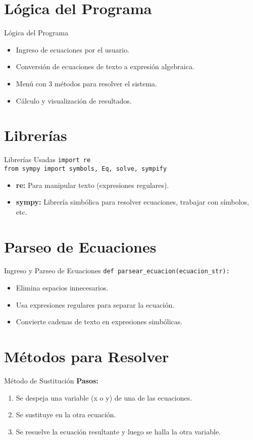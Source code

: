 \documentclass{beamer}
\begin{document}
\section{Lógica del Programa}
\begin{frame}{Lógica del Programa}
  \begin{itemize}
    \item Ingreso de ecuaciones por el usuario.
    \item Conversión de ecuaciones de texto a expresión algebraica.
    \item Menú con 3 métodos para resolver el sistema.
    \item Cálculo y visualización de resultados.
  \end{itemize}
\end{frame}

\section{Librerías}
\begin{frame}{Librerías Usadas}
  \texttt{import re} \\
  \texttt{from sympy import symbols, Eq, solve, sympify}
  \vspace{0.5cm}
  \begin{itemize}
    \item \textbf{re:} Para manipular texto (expresiones regulares).
    \item \textbf{sympy:} Librería simbólica para resolver ecuaciones, trabajar con símbolos, etc.
  \end{itemize}
\end{frame}

\section{Parseo de Ecuaciones}
\begin{frame}{Ingreso y Parseo de Ecuaciones}
  \texttt{def parsear\_ecuacion(ecuacion\_str):}
  \begin{itemize}
    \item Elimina espacios innecesarios.
    \item Usa expresiones regulares para separar la ecuación.
    \item Convierte cadenas de texto en expresiones simbólicas.
  \end{itemize}
\end{frame}

\section{Métodos para Resolver}
\begin{frame}{Método de Sustitución}
  \textbf{Pasos:}
  \begin{enumerate}
    \item Se despeja una variable (x o y) de una de las ecuaciones.
    \item Se sustituye en la otra ecuación.
    \item Se resuelve la ecuación resultante y luego se halla la otra variable.
  \end{enumerate}
\end{frame}
\end{document}
